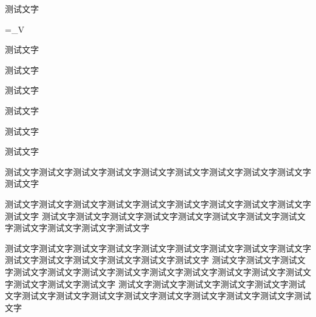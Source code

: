 \begin{Project}
\begin{Definition}[测试文字]
	测试文字
	\begin{flalign}
		\Psi=\int_\Omega{}V
	\end{flalign}
\end{Definition}

\begin{Lemma}
	测试文字
\end{Lemma}

\begin{Theorem}[测试文字]
	测试文字
\end{Theorem}

\begin{Axiom}[测试文字][测试文字]
	测试文字
\end{Axiom}


\begin{Proposition}
	测试文字
\end{Proposition}


\begin{Corollary}
	测试文字
\end{Corollary}

\begin{Lemma}
	测试文字
\end{Lemma}


\begin{Lemma*}[测试文字测试文字]
	测试文字测试文字测试文字测试文字测试文字测试文字测试文字测试文字测试文字测试文字
	
	测试文字测试文字测试文字测试文字测试文字测试文字测试文字测试文字测试文字测试文字
	\zhlipsum
	测试文字测试文字测试文字测试文字测试文字测试文字测试文字测试文字测试文字测试文字测试文字测试文字
	\tcblower
	\zhlipsum[2]
	\zhlipsum[2]
\end{Lemma*}


\begin{multicols}{3}
测试文字测试文字测试文字测试文字测试文字测试文字测试文字测试文字测试文字测试文字测试文字测试文字测试文字测试文字测试文字
测试文字测试文字测试文字测试文字测试文字测试文字测试文字测试文字测试文字测试文字测试文字测试文字测试文字测试文字测试文字
测试文字测试文字测试文字测试文字测试文字测试文字测试文字测试文字测试文字测试文字测试文字测试文字测试文字测试文字测试文字
\end{multicols}




\Listening


\end{Project}
